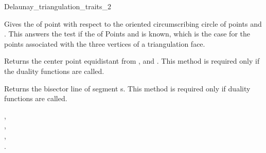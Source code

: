 \begin{ccRefConcept}{Delaunay_triangulation_traits_2}
\ccCreation
{}  %


\ccPredicates
{}
{Gives the  of point  with respect to
the oriented circumscribing circle of  points  and .
This answers the   test if the 
of  Points  and  is known,
which is the case for the points associated with the three
vertices of a triangulation face.}


\ccOperations
{} { Returns the center point equidistant from ,  and
. This method is required only if the duality functions are called.}

{Returns the bisector line of segment s. This method is required only if duality functions
are called.}

\ccHasModels
{}, \\
, \\
, \\
.


\end{ccRefConcept}


